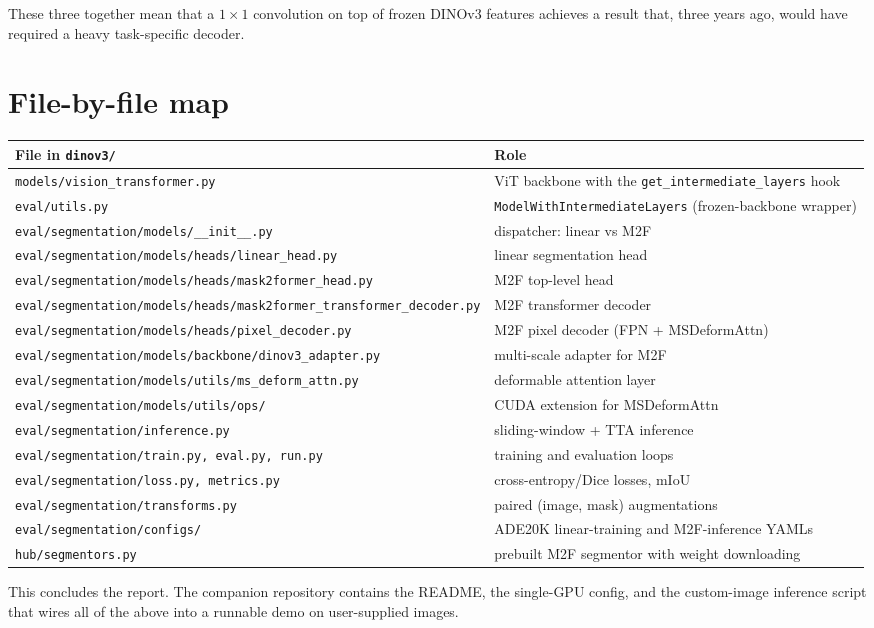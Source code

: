 \documentclass[11pt,a4paper]{article}
\begin{document}
These three together mean that a $1{\times}1$ convolution on top of frozen
DINOv3 features achieves a result that, three years ago, would have
required a heavy task-specific decoder.

\section{File-by-file map}

\begin{center}\footnotesize
\begin{tabular}{ll}
\toprule
File in \texttt{dinov3/} & Role \\
\midrule
\texttt{models/vision\_transformer.py}                 & ViT backbone with the \texttt{get\_intermediate\_layers} hook \\
\texttt{eval/utils.py}                                 & \texttt{ModelWithIntermediateLayers} (frozen-backbone wrapper) \\
\texttt{eval/segmentation/models/\_\_init\_\_.py}      & dispatcher: linear vs M2F \\
\texttt{eval/segmentation/models/heads/linear\_head.py}& linear segmentation head \\
\texttt{eval/segmentation/models/heads/mask2former\_head.py} & M2F top-level head \\
\texttt{eval/segmentation/models/heads/mask2former\_transformer\_decoder.py} & M2F transformer decoder \\
\texttt{eval/segmentation/models/heads/pixel\_decoder.py} & M2F pixel decoder (FPN + MSDeformAttn) \\
\texttt{eval/segmentation/models/backbone/dinov3\_adapter.py} & multi-scale adapter for M2F \\
\texttt{eval/segmentation/models/utils/ms\_deform\_attn.py} & deformable attention layer \\
\texttt{eval/segmentation/models/utils/ops/}           & CUDA extension for MSDeformAttn \\
\texttt{eval/segmentation/inference.py}                & sliding-window + TTA inference \\
\texttt{eval/segmentation/train.py, eval.py, run.py}   & training and evaluation loops \\
\texttt{eval/segmentation/loss.py, metrics.py}         & cross-entropy/Dice losses, mIoU \\
\texttt{eval/segmentation/transforms.py}               & paired (image, mask) augmentations \\
\texttt{eval/segmentation/configs/}                    & ADE20K linear-training and M2F-inference YAMLs \\
\texttt{hub/segmentors.py}                             & prebuilt M2F segmentor with weight downloading \\
\bottomrule
\end{tabular}
\end{center}

\bigskip
\noindent
This concludes the report. The companion repository contains the README,
the single-GPU config, and the custom-image inference script that wires
all of the above into a runnable demo on user-supplied images.
\end{document}
